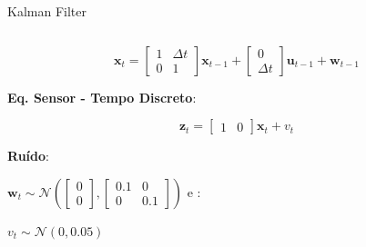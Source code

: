\documentclass[aspectratio=169]{beamer}
\begin{document}
\begin{frame}[c]{Kalman Filter}
\begin{columns}
\begin{column}[c]{0.6\textwidth}
            \begin{equation*}
                \mathbf{x}_t = 
                \begin{bmatrix}
                        1 & \Delta t \\
                        0 & 1
                \end{bmatrix}
                \mathbf{x}_{t-1} +
                \begin{bmatrix}
                        0 \\
                        \Delta t
                \end{bmatrix}
                \mathbf{u}_{t-1} +
                \mathbf{w}_{t-1}
            \end{equation*}

            \textbf{Eq. Sensor - Tempo Discreto}:

            \begin{equation*}
                \mathbf{z}_t = 
                \begin{bmatrix}
                        1 & 0
                \end{bmatrix}
                \mathbf{x}_{t} +
                v_{t}
            \end{equation*}            

            \textbf{Ruído}:

            $\mathbf{w}_t \sim \mathcal{N} 
                \left(
                    \begin{bmatrix}
                    0 \\ 0    
                    \end{bmatrix},
                    \begin{bmatrix}
                    0.1 & 0 \\
                    0   & 0.1
                \end{bmatrix}
                \right)$ e :
            
            $ v_t \sim \mathcal{N} (0,0.05)$

        \end{column}
    \end{columns}
\end{frame}
\end{document}

